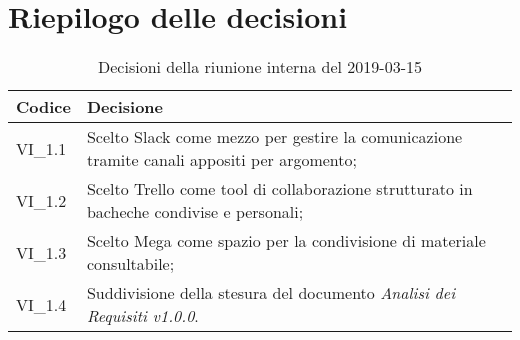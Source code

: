 \section{Riepilogo delle decisioni}

	
	\begin{longtable}{ >{\centering}p{} >{}p{}}
		\caption{Decisioni della riunione interna del 2019-03-15}\\	
		\rowcolorhead
		\textbf{\color{white}Codice} 
		& \centering\textbf{\color{white}Decisione} 
		\tabularnewline 
		\endfirsthead
		VI\_1.1 & Scelto Slack come mezzo per gestire la comunicazione tramite canali appositi per argomento;
		
		\tabularnewline 
		VI\_1.2 & Scelto Trello come tool di collaborazione strutturato in bacheche condivise e personali;
		
		\tabularnewline 
		VI\_1.3 & Scelto Mega come spazio per la condivisione di materiale consultabile;
	
		\tabularnewline 
		VI\_1.4 & Suddivisione della stesura del documento \textit{Analisi dei Requisiti v1.0.0}.
	
	\end{longtable}
	




